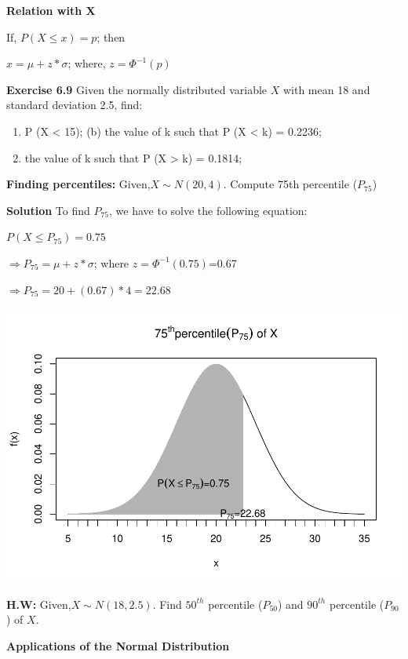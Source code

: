 \documentclass[
]{article}
\providecommand{\tightlist}{%
  \setlength{\itemsep}{0pt}\setlength{\parskip}{0pt}}
\begin{document}
\textbf{Relation with X}

If, \(P(X\le x)=p\); then

\(x=\mu+z*\sigma\); where, \(z=\Phi^{-1}(p)\)

\textbf{Exercise 6.9}\citep{walpole_probability_2017} Given the normally distributed variable \(X\) with mean 18 and standard deviation 2.5, find:

\begin{enumerate}
\def\labelenumi{(\alph{enumi})}
\tightlist
\item
  P (X \textless{} 15); (b) the value of k such that P (X \textless{} k) = 0.2236;
\item
  the value of k such that P (X \textgreater{} k) = 0.1814;
\end{enumerate}

\textbf{Finding percentiles:} Given,\(X\sim N(20,4)\). Compute 75th percentile (\(P_{75}\))

\textbf{Solution} To find \(P_{75}\), we have to solve the following equation:

\(P(X \le P_{75})=0.75\)

\(\Rightarrow P_{75}=\mu+ z*\sigma\); where \(z=\Phi ^{-1}(0.75)\)=0.67

\(\Rightarrow P_{75}=20+ (0.67)*4=22.68\)

\includegraphics{_main_files/figure-latex/unnamed-chunk-8-1.pdf}

\textbf{H.W:} Given,\(X\sim N(18,2.5)\). Find \(50^{th}\) percentile (\(P_{50}\)) and \(90^{th}\) percentile (\(P_{90}\)) of \(X\).

\textbf{Applications of the Normal Distribution}\citep{walpole_probability_2017}
\end{document}
